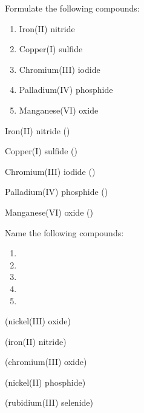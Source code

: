 \documentclass[main.tex]{subfiles}
\begin{document}
\begin{multicols*}{2}
\begin{question}[ID=\the\value{numA}]
Formulate the following compounds:
 \noindent
  \begin{enumerate} [topsep=0pt, partopsep=0pt, label=(\alph*), leftmargin=.4cm]
\item  Iron(II) nitride %
 \item  Copper(I) sulfide %
 \item  Chromium(III) iodide %
 \item  Palladium(IV) phosphide %
 \item  Manganese(VI) oxide %
\end{enumerate}
\end{question}
\begin{solution}
\begin{inparaenum}[(a)]
 \item  Iron(II) nitride  ()
 \item  Copper(I) sulfide  ()
 \item  Chromium(III) iodide  ()
 \item  Palladium(IV) phosphide  ()
 \item  Manganese(VI) oxide  ()
\end{inparaenum}\hspace{0.1cm}\end{solution}

\begin{question}[ID=\the\value{numA}]
Name the following compounds:
   \begin{multicols}{2}\noindent
  \begin{enumerate} [topsep=0pt, partopsep=0pt, label=(\alph*), leftmargin=.5cm]
\item  {} %
\item  {} %
\item  {} %
\item  {} %
\item  {} %
\end{enumerate}  \end{multicols} 
\end{question}
\begin{solution}
\begin{inparaenum}[(a)]
 \item  {}  (nickel(III) oxide)
\item  {}  (iron(II) nitride)
\item  {}  (chromium(III) oxide)
\item  {}  (nickel(II) phosphide)
\item  {}  (rubidium(III) selenide)
\end{inparaenum}\hspace{0.1cm}\end{solution}



\end{multicols*}
\end{document}

